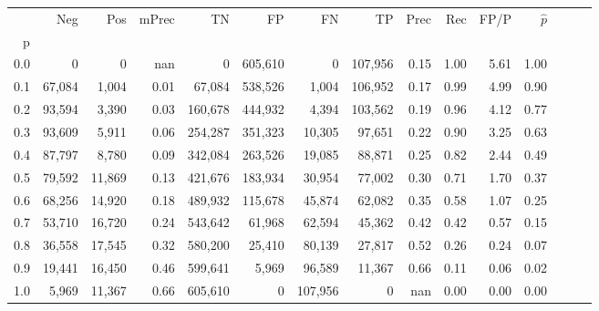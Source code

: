 \begin{tabular}{rrrrrrrrrrrrrrr}
\toprule
{} &     Neg &     Pos & mPrec &       TN &       FP &       FN &       TP &  Prec &   Rec &  FP/P & $\hat{p}$ \\
p   &         &         &       &          &          &          &          &       &       &       &           \\
\midrule
0.0 &       0 &       0 &   nan &        0 &  605,610 &        0 &  107,956 &  0.15 &  1.00 &  5.61 &      1.00 \\
0.1 &  67,084 &   1,004 &  0.01 &   67,084 &  538,526 &    1,004 &  106,952 &  0.17 &  0.99 &  4.99 &      0.90 \\
0.2 &  93,594 &   3,390 &  0.03 &  160,678 &  444,932 &    4,394 &  103,562 &  0.19 &  0.96 &  4.12 &      0.77 \\
0.3 &  93,609 &   5,911 &  0.06 &  254,287 &  351,323 &   10,305 &   97,651 &  0.22 &  0.90 &  3.25 &      0.63 \\
0.4 &  87,797 &   8,780 &  0.09 &  342,084 &  263,526 &   19,085 &   88,871 &  0.25 &  0.82 &  2.44 &      0.49 \\
0.5 &  79,592 &  11,869 &  0.13 &  421,676 &  183,934 &   30,954 &   77,002 &  0.30 &  0.71 &  1.70 &      0.37 \\
0.6 &  68,256 &  14,920 &  0.18 &  489,932 &  115,678 &   45,874 &   62,082 &  0.35 &  0.58 &  1.07 &      0.25 \\
0.7 &  53,710 &  16,720 &  0.24 &  543,642 &   61,968 &   62,594 &   45,362 &  0.42 &  0.42 &  0.57 &      0.15 \\
0.8 &  36,558 &  17,545 &  0.32 &  580,200 &   25,410 &   80,139 &   27,817 &  0.52 &  0.26 &  0.24 &      0.07 \\
0.9 &  19,441 &  16,450 &  0.46 &  599,641 &    5,969 &   96,589 &   11,367 &  0.66 &  0.11 &  0.06 &      0.02 \\
1.0 &   5,969 &  11,367 &  0.66 &  605,610 &        0 &  107,956 &        0 &   nan &  0.00 &  0.00 &      0.00 \\
\bottomrule
\end{tabular}
